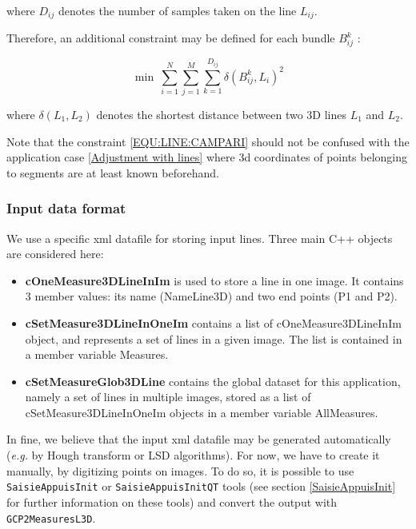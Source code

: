 \noindent where $D_{ij}$ denotes the number of samples taken on the line $L_{ij}$. \newline

\noindent Therefore, an additional constraint may be defined for each bundle $B_{ij}^k$ : \newline

\begin{equation}
\min ~ \sum_{i=1}^{N} \sum_{j=1}^{M} \sum_{k=1}^{D_{ij}} \delta(B_{ij}^k,L_i)^2 \label{EQU:LINE:CAMPARI}
\end{equation}
\vspace{0.2cm}

\noindent where $\delta(L_1, L_2)$ denotes the shortest distance between two 3D lines $L_1$ and $L_2$. \newline

\noindent Note that the constraint \ref{EQU:LINE:CAMPARI} should not be confused with the application case \ref{Adjustment with lines} where 3d coordinates of points belonging to segments are at least known beforehand. \newline

\subsubsection{Input data format}

We use a specific xml datafile for storing input lines. Three main C++ objects are considered here: \newline

\begin{itemize}
	\item \textbf{cOneMeasure3DLineInIm} is used to store a line in one image. It contains 3 member values: its name (NameLine3D) and two end points (P1 and P2). \newline
	\item \textbf{cSetMeasure3DLineInOneIm} contains a list of cOneMeasure3DLineInIm object, and represents a set of lines in a given image. The list is contained in a member variable Measures. \newline
	\item \textbf{cSetMeasureGlob3DLine} contains the global dataset for this application, namely a set of lines in multiple images, stored as a list of cSetMeasure3DLineInOneIm objects in a member variable AllMeasures. \newline
\end{itemize}

\noindent In fine, we believe that the input xml datafile may be generated automatically (\textit{e.g.} by Hough transform or LSD algorithms). For now, we have to create it manually, by digitizing points on images. To do so, it is possible to use \texttt{SaisieAppuisInit} or \texttt{SaisieAppuisInitQT} tools (see section \ref{SaisieAppuisInit} for further information on these tools) and convert the output with \texttt{GCP2MeasuresL3D}. \newline


